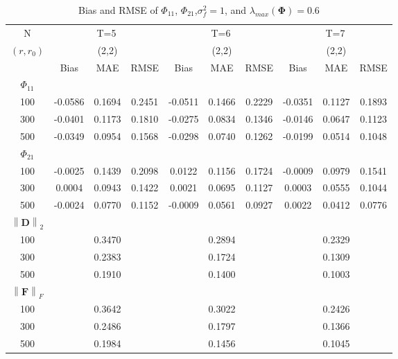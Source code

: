 \documentclass[12pt,a4paper,hyperref]{article}
\begin{document}
\begin{table}[H]
\caption{Bias and RMSE of $\Phi_{11}$, $\Phi_{21}$,$\sigma^{2}_{f}=1$,  and $\lambda_{max}(\boldsymbol{\Phi})=0.6$}
\centering
\tabcolsep=0.11cm
\begin{threeparttable}
\begin{tabular} {*{10}{c}}
\toprule
N& \multicolumn{3}{c}{T=5}&\multicolumn{3}{c}{T=6}&\multicolumn{3}{c}{T=7}\\
\cmidrule(lr){1-10}
$(r,r_{0})$ &   &(2,2)  &  &   &(2,2)  & &  &(2,2) & \\
\cmidrule(lr){1-4} \cmidrule(lr){5-7}\cmidrule(lr){8-10}
& \multicolumn{1}{c}{Bias} &\multicolumn{1}{c}{MAE}& \multicolumn{1}{c}{RMSE}&\multicolumn{1}{c}{Bias} &\multicolumn{1}{c}{MAE}& \multicolumn{1}{c}{RMSE}&\multicolumn{1}{c}{Bias}&\multicolumn{1}{c}{MAE} & \multicolumn{1}{c}{RMSE}\\
  \cmidrule(lr){2-4} \cmidrule(lr){5-7} \cmidrule(lr){8-10}
 $\Phi_{11}$\\
\cmidrule(lr){1-10}
 100&-0.0586 & 0.1694&0.2451 & -0.0511 &0.1466&0.2229 & -0.0351&0.1127 & 0.1893\\
300&-0.0401&0.1173& 0.1810& -0.0275& 0.0834& 0.1346& -0.0146& 0.0647&0.1123\\
500&-0.0349 &0.0954&0.1568 & -0.0298& 0.0740&0.1262 &-0.0199& 0.0514& 0.1048\\
\cmidrule(lr){1-10}
$\Phi_{21}$\\
\cmidrule(lr){1-4}   \cmidrule(lr){5-7}   \cmidrule(lr){8-10}
100& -0.0025& 0.1439&0.2098 & 0.0122 &0.1156 & 0.1724& -0.0009& 0.0979& 0.1541\\
300& 0.0004&0.0943 &0.1422& 0.0021 & 0.0695& 0.1127& 0.0003&0.0555 &0.1044\\
500& -0.0024& 0.0770& 0.1152& -0.0009 & 0.0561& 0.0927& 0.0022&0.0412 & 0.0776\\
\cmidrule(lr){1-10}
$\left\| \boldsymbol{D} \right\|_{2} $\\
\cmidrule(lr){1-4}   \cmidrule(lr){5-7}   \cmidrule(lr){8-10}
100& &0.3470& &  &0.2894& & &0.2329 & \\
300& & 0.2383& &  &0.1724& & & 0.1309&\\
500& & 0.1910& &  & 0.1400& & &0.1003 & \\
\cmidrule(lr){1-10}
$\left\| \boldsymbol{F} \right\|_{F} $\\
\cmidrule(lr){1-4}   \cmidrule(lr){5-7}   \cmidrule(lr){8-10}
100& &0.3642& &  &0.3022& & & 0.2426& \\
300& &0.2486& &  &0.1797& & &0.1366&\\
500& &0.1984& &  & 0.1456& & & 0.1045& \\
\bottomrule
\end{tabular}


\end{threeparttable}
\end{table}
\end{document}
